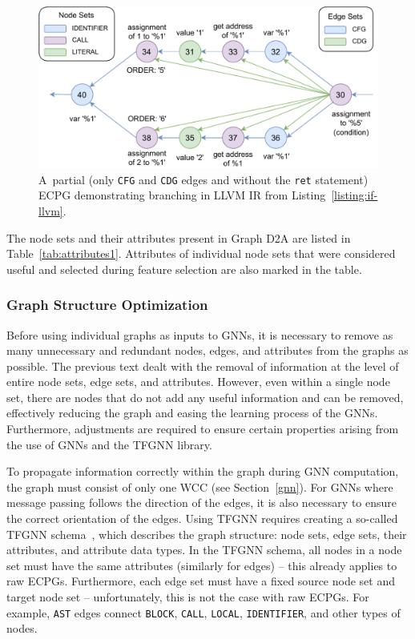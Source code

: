 \begin{figure}[t]
	\centering
	\includegraphics[width=1\textwidth]{figures/ecpg-if.pdf}
	\caption{A~partial (only \texttt{CFG} and \texttt{CDG} edges and without the \texttt{ret} statement) ECPG demonstrating branching in LLVM IR from Listing~\ref{listing:if-llvm}.}
	\label{figure:if}
\end{figure}
    
The node sets and their attributes present in Graph D2A are listed in Table~\ref{tab:attributes1}. Attributes of individual node sets that were considered useful and selected during feature selection are also marked in the table.

\subsubsection{Graph Structure Optimization}
Before using individual graphs as inputs to GNNs, it is necessary to remove as many unnecessary and redundant nodes, edges, and attributes from the graphs as possible. The previous text dealt with the removal of information at the level of entire node sets, edge sets, and attributes. However, even within a single node set, there are nodes that do not add any useful information and can be removed, effectively reducing the graph and easing the learning process of the GNNs. Furthermore, adjustments are required to ensure certain properties arising from the use of GNNs and the TFGNN library.

To propagate information correctly within the graph during GNN computation, the graph must consist of only one WCC (see Section~\ref{gnn}). For GNNs where message passing follows the direction of the edges, it is also necessary to ensure the correct orientation of the edges. Using TFGNN requires creating a so-called TFGNN schema~\cite{tfgnn-schema}, which describes the graph structure: node sets, edge sets, their attributes, and attribute data types. In the TFGNN schema, all nodes in a node set must have the same attributes (similarly for edges) -- this already applies to raw ECPGs. Furthermore, each edge set must have a fixed source node set and target node set -- unfortunately, this is not the case with raw ECPGs. For example, \texttt{AST} edges connect \texttt{BLOCK}, \texttt{CALL}, \texttt{LOCAL}, \texttt{IDENTIFIER}, and other types of nodes.

